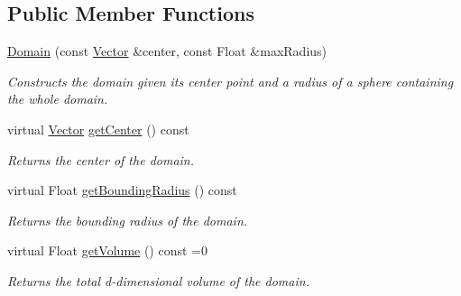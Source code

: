 \subsection*{Public Member Functions}
\begin{DoxyCompactItemize}
\item 
\hypertarget{classAbstract_1_1Domain_a6c974123492230c334468091cefa66dd}{}\label{classAbstract_1_1Domain_a6c974123492230c334468091cefa66dd} 
\hyperlink{classAbstract_1_1Domain_a6c974123492230c334468091cefa66dd}{Domain} (const \hyperlink{classBasicVector}{Vector} \&center, const Float \&max\+Radius)
\begin{DoxyCompactList}\small\item\em Constructs the domain given its center point and a radius of a sphere containing the whole domain. \end{DoxyCompactList}\item 
\hypertarget{classAbstract_1_1Domain_a49180d7f20dc6eda9a7798a0052d4114}{}\label{classAbstract_1_1Domain_a49180d7f20dc6eda9a7798a0052d4114} 
virtual \hyperlink{classBasicVector}{Vector} \hyperlink{classAbstract_1_1Domain_a49180d7f20dc6eda9a7798a0052d4114}{get\+Center} () const
\begin{DoxyCompactList}\small\item\em Returns the center of the domain. \end{DoxyCompactList}\item 
\hypertarget{classAbstract_1_1Domain_afa2c3a29f56b31e35613b05078918f9f}{}\label{classAbstract_1_1Domain_afa2c3a29f56b31e35613b05078918f9f} 
virtual Float \hyperlink{classAbstract_1_1Domain_afa2c3a29f56b31e35613b05078918f9f}{get\+Bounding\+Radius} () const
\begin{DoxyCompactList}\small\item\em Returns the bounding radius of the domain. \end{DoxyCompactList}\item 
\hypertarget{classAbstract_1_1Domain_aa1e2803ef3f90984bdb82e46df32a082}{}\label{classAbstract_1_1Domain_aa1e2803ef3f90984bdb82e46df32a082} 
virtual Float \hyperlink{classAbstract_1_1Domain_aa1e2803ef3f90984bdb82e46df32a082}{get\+Volume} () const =0
\begin{DoxyCompactList}\small\item\em Returns the total d-\/dimensional volume of the domain. \end{DoxyCompactList}\item 
\hypertarget{classAbstract_1_1Domain_ac562e4b29568a1572b01853d5809e87f}{}\label{classAbstract_1_1Domain_ac562e4b29568a1572b01853d5809e87f} 

\end{DoxyCompactItemize}

